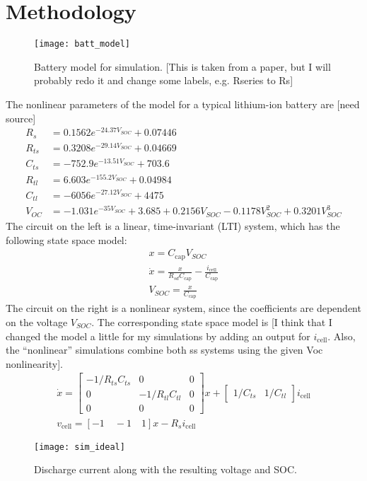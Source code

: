 \chapter{Methodology}


\begin{figure}
\centering
\texttt{[image: batt\_model]}
\caption{Battery model for simulation. [This is taken from a paper, but I will probably redo it and change some labels, e.g. Rseries to Rs]}
\label{fig:batt_model}
\end{figure}

The nonlinear parameters of the model for a typical lithium-ion battery are [need source]
\begin{align}
	R_s &= 0.1562 e^{-24.37 V_{SOC}} + 0.07446 \\
	R_{ts} &= 0.3208 e^{-29.14 V_{SOC}} + 0.04669 \\
	C_{ts} &= -752.9 e^{-13.51 V_{SOC}} + 703.6 \\
	R_{tl} &= 6.603 e^{-155.2 V_{SOC}} + 0.04984 \\
	C_{tl} &= -6056 e^{-27.12 V_{SOC}} + 4475 \\
	V_{OC} &= -1.031 e^{-35 V_{SOC}} + 3.685 + 0.2156 V_{SOC} - 0.1178 V_{SOC}^2 + 0.3201 V_{SOC}^3
\end{align}
The circuit on the left is a linear, time-invariant (LTI) system, which has the following state space model:
\begin{gather}
    x = C_\text{cap} V_{SOC} \\
    \dot{x} = \frac{x}{R_{sd} C_\text{cap}} - \frac{i_\text{cell}}{C_\text{cap}} \\
    V_{SOC} = \frac{x}{C_\text{cap}}
\end{gather}
The circuit on the right is a nonlinear system, since the coefficients are dependent on the voltage $V_{SOC}$. The corresponding state space model is [I think that I changed the model a little for my simulations by adding an output for $i_\text{cell}$. Also, the ``nonlinear'' simulations combine both ss systems using the given Voc nonlinearity].
\begin{gather}
	\dot{x} = \begin{bmatrix}
		-1/R_{ts}C_{ts} & 0 & 0 \\
		0 & -1/R_{tl}C_{tl} & 0 \\
		0 & 0 & 0
		\end{bmatrix} x 
		+ \begin{bmatrix} 1/C_{ts} & 1/C_{tl} \end{bmatrix} i_\text{cell} \\
	v_\text{cell} = [-1 \quad -1 \quad 1] x - R_s i_\text{cell}
\end{gather}

\begin{figure}
\centering
\texttt{[image: sim\_ideal]}
\caption{Discharge current along with the resulting voltage and SOC.}
\label{fig:idealsim}
\end{figure}
